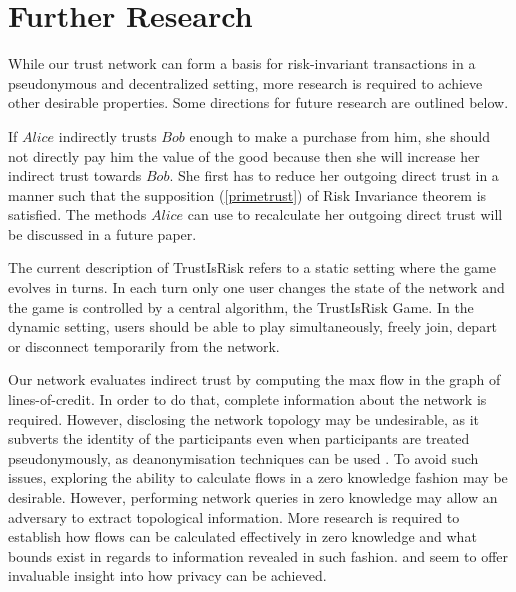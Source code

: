 \section{Further Research}

  While our trust network can form a basis for risk-invariant transactions in a pseudonymous and decentralized setting, more
  research is required to achieve other desirable properties. Some directions for future research are outlined below.

  If $Alice$ indirectly trusts $Bob$ enough to make a purchase from him, she should not directly pay him the value of the
  good because then she will increase her indirect trust towards $Bob$. She first has to reduce her outgoing direct trust in
  a manner such that the supposition (\ref{primetrust}) of Risk Invariance theorem is satisfied. The methods $Alice$ can use
  to recalculate her outgoing direct trust will be discussed in a future paper.

  The current description of TrustIsRisk refers to a static setting where the game evolves in turns. In each turn only one
  user changes the state of the network and the game is controlled by a central algorithm, the TrustIsRisk Game. In the
  dynamic setting, users should be able to play simultaneously, freely join, depart or disconnect temporarily from the
  network.

  Our network evaluates indirect trust by computing the max flow in the graph of lines-of-credit. In order to do that,
  complete information about the network is required. However, disclosing the network topology may be undesirable, as
  it subverts the identity of the participants even when participants are treated pseudonymously, as deanonymisation
  techniques can be used \cite{deanonymisation}. To avoid such issues, exploring the ability to calculate flows in a
  zero knowledge fashion may be desirable. However, performing network queries in zero knowledge may allow an adversary
  to extract topological information. More research is required to establish how flows can be calculated effectively in
  zero knowledge and what bounds exist in regards to information revealed in such fashion. \cite{silentwhispers} and
  \cite{privpay} seem to offer invaluable insight into how privacy can be achieved.

